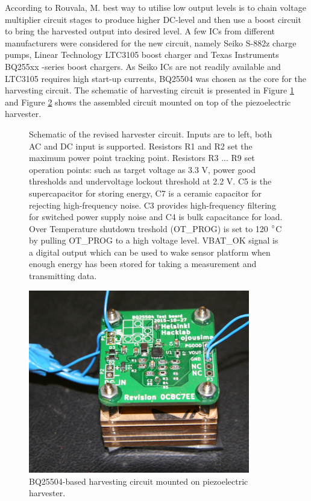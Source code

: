 According to Rouvala, M. \cite{Rouvala2015} best way to utilise low output levels is to chain voltage multiplier circuit stages to produce higher DC-level and then use a boost circuit to bring the harvested output into desired level. A few ICs from different manufacturers were considered for the new circuit, namely Seiko S-882z \cite{SeikoInstruments2010} charge pumps, Linear Technology LTC3105 \cite{ltc3015} boost charger and Texas Instruments BQ255xx -series boost chargers. As Seiko ICs are not readily available and LTC3105 requires high start-up currents, BQ25504 \cite{bq25504} was chosen as the core for the harvesting circuit. The schematic of harvesting circuit is presented in Figure \ref{fig:bq25504} and Figure \ref{fig:bq25504_mounted} shows the assembled circuit mounted on top of the piezoelectric harvester.


\begin{figure}[htb]
    \centering
    \def\svgwidth{\columnwidth}
    
    \caption{\label{fig:bq25504} Schematic of the revised harvester circuit. Inputs are to left, both AC and DC input is supported. Resistors R1 and R2 set the maximum power point tracking point. Resistors R3 ... R9 set operation points: such as target voltage as 3.3 V, power good thresholds and undervoltage lockout threshold at 2.2 V. C5 is the supercapacitor for storing energy, C7 is a ceramic capacitor for rejecting high-frequency noise. C3 provides high-frequency filtering for switched power supply noise and C4 is bulk capacitance for load. Over Temperature shutdown treshold (OT\_PROG) is set to 120 $\degree$C by pulling OT\_PROG to a high voltage level. VBAT\_OK signal is a digital output which can be used to wake sensor platform when enough energy has been stored for taking a measurement and transmitting data.}
\end{figure}

\begin{figure}[htb]
\begin{center}
\includegraphics[height=8cm]{images/own_pic/tyre_fixture/piezo_bq_desk.jpg}
\end{center}
\caption{\label{fig:bq25504_mounted} BQ25504-based harvesting circuit mounted on piezoelectric harvester.}
\end{figure}

